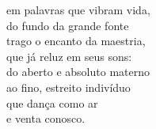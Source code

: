 em palavras que vibram vida,\\
do fundo da grande fonte\\
trago o encanto da maestria,\\
que já reluz em seus sons:\\
do aberto e absoluto materno\\
ao fino, estreito indivíduo\\
que dança como ar\\
e venta conosco.

